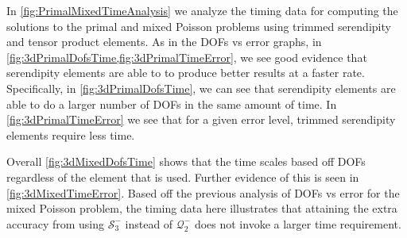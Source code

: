 \documentclass[format=acmsmall,screen,timestamp=false,a4paper]{acmart}
\begin{document}
In \cref{fig:PrimalMixedTimeAnalysis} we analyze the timing data for computing the solutions to the primal and mixed Poisson problems using trimmed serendipity and tensor product elements.  As in the DOFs vs error graphs, in \cref{fig:3dPrimalDofsTime,fig:3dPrimalTimeError}, we see good evidence that serendipity elements are able to to produce better results at a faster rate.  Specifically, in \cref{fig:3dPrimalDofsTime}, we can see that serendipity elements are able to do a larger number of DOFs in the same amount of time.  In \cref{fig:3dPrimalTimeError} we see that for a given error level, trimmed serendipity elements require less time. 

Overall \cref{fig:3dMixedDofsTime} shows that the time scales based off DOFs regardless of the element that is used.  Further evidence of this is seen in \cref{fig:3dMixedTimeError}.  Based off the previous analysis of DOFs vs error for the mixed Poisson problem, the timing data here illustrates that attaining the extra accuracy from using $\mathcal{S}^-_3$ instead of $\mathcal{Q}^-_2$ does not invoke a larger time requirement.  



\end{document}
